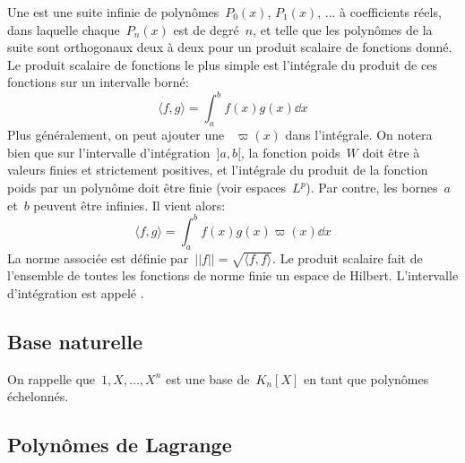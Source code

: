 Une  est une suite infinie de polynômes~$P_0(x)$, $P_1(x)$, ... à coefficients réels, dans laquelle chaque~$P_n(x)$ est de degré~$n$, et telle que les polynômes de la suite sont orthogonaux deux à deux pour un produit scalaire de fonctions donné. Le produit scalaire de fonctions le plus simple est l'intégrale du produit de ces fonctions sur un intervalle borné: 
\begin{equation}
\langle f,g \rangle=\int_a^b f(x)g(x)\dd x 
\end{equation}
Plus généralement, on peut ajouter une ~$\varpi(x)$ dans l'intégrale. On notera bien que sur l'intervalle d'intégration~$]a,b[$, la fonction poids~$W$ doit être à valeurs finies et strictement positives, et l'intégrale du produit de la fonction poids par un polynôme doit être finie (voir espaces~$L^p$). Par contre, les bornes~$a$ et~$b$ peuvent être infinies. Il vient alors: 
\begin{equation}
 \langle f,g \rangle=\int_a^b f(x)g(x)\varpi(x)\dd x 
\end{equation}
La norme associée est définie par~$||f||=\sqrt{\langle f,f \rangle}$. Le produit scalaire fait de l'ensemble de toutes les fonctions de norme finie un espace de Hilbert. L'intervalle d'intégration est appelé . 

\medskip
\subsection{Base naturelle} 

On rappelle que~$1,X,\ldots,X^n$ est une base de~$K_n[X]$ en tant que polynômes échelonnés. 

\medskip
\subsection{Polynômes de Lagrange} 

